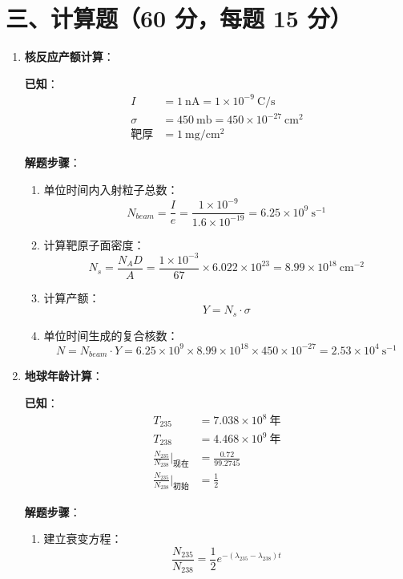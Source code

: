 \documentclass{article}
\begin{document}
\section*{三、计算题（60 分，每题 15 分）}
\begin{enumerate}
    \item \textbf{核反应产额计算}：
    
    \textbf{已知}：
    \begin{align*}
        I &= 1\ \mathrm{nA} = 1\times10^{-9}\ \mathrm{C/s} \\
        \sigma &= 450\ \mathrm{mb} = 450\times10^{-27}\ \mathrm{cm^2} \\
        \text{靶厚} &= 1\ \mathrm{mg/cm^2}
    \end{align*}
    
    \textbf{解题步骤}：
    \begin{enumerate}
        \item 单位时间内入射粒子总数：
        $$
        N_{beam} = \frac{I}{e} = \frac{1\times10^{-9}}{1.6\times10^{-19}} = 6.25\times10^{9}\ \mathrm{s^{-1}}
        $$
        
        \item 计算靶原子面密度：
        $$
        N_{s} = \frac{N_A D}{A} = \frac{1\times10^{-3}}{67}\times6.022\times10^{23} = 8.99\times10^{18}\ \mathrm{cm^{-2}}
        $$

        \item 计算产额：
        $$
        Y = N_{s} \cdot \sigma
        $$
        
        \item 单位时间生成的复合核数：
        $$
        N = N_{beam} \cdot Y = 6.25\times10^{9} \times 8.99\times10^{18} \times 450\times10^{-27} = 2.53 \times10^{4}\ \mathrm{s^{-1}}
        $$
    \end{enumerate}
    
    \item \textbf{地球年龄计算}：
    
    \textbf{已知}：
    \begin{align*}
        T_{235} &= 7.038\times10^8\ \mathrm{年} \\
        T_{238} &= 4.468\times10^9\ \mathrm{年} \\
        \frac{N_{235}}{N_{238}}|_{现在} &= \frac{0.72}{99.2745} \\
        \frac{N_{235}}{N_{238}}|_{初始} &= \frac{1}{2}
    \end{align*}
    
    \textbf{解题步骤}：
    \begin{enumerate}
        \item 建立衰变方程：
        $$
        \frac{N_{235}}{N_{238}} = \frac{1}{2} e^{-(\lambda_{235}-\lambda_{238})t}
        $$
        

\end{enumerate}
\end{enumerate}
\end{document}
